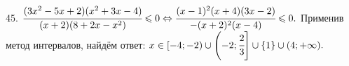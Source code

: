 45. $\cfrac{(3x^2-5x+2)(x^2+3x-4)}{(x+2)(8+2x-x^2)}\leqslant0\Leftrightarrow\cfrac{(x-1)^2(x+4)(3x-2)}{-(x+2)^2(x-4)}\leqslant0.$ Применив метод интервалов, найдём ответ: $x\in[-4;-2)\cup\left(-2;\cfrac{2}{3}\right]\cup\{1\}\cup(4;+\infty).$
\begin{figure}[ht!]
\end{figure}\\
